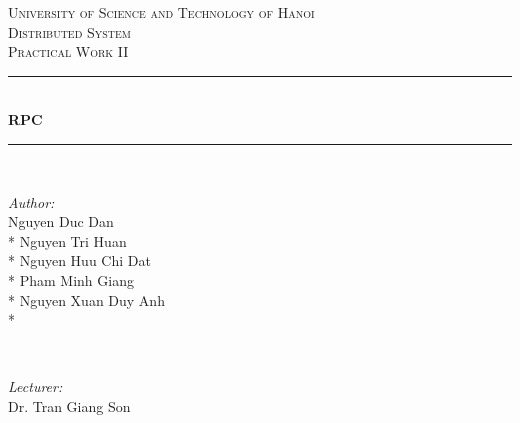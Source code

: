 \documentclass[12pt]{article}
\begin{document}
	
	\begin{titlepage}
		
		\newcommand{\HRule}{\rule{\linewidth}{0.1mm}} %
		
		\center %
		
		
		\textsc{\LARGE University of Science and
			\linebreak
			\linebreak
			Technology of Hanoi}\\[2cm] %
		\textsc{\Large Distributed System}\\[0.5cm] %
		\textsc{\large Practical Work II}\\[0.5cm] %
		
		
		\HRule \\[0.4cm]
		{ \huge \bfseries  RPC}\\[0.4cm] %
		\HRule \\[1.5cm]
		
		
		\begin{minipage}[t]{0.4\textwidth}
			\begin{flushleft} \large
				\emph{Author:}\\
				Nguyen Duc Dan \\*
				Nguyen Tri Huan	 \\*	
				Nguyen Huu Chi Dat \\* 
				Pham Minh Giang \\*
				Nguyen Xuan Duy Anh \\*
			\end{flushleft}
		\end{minipage}
		~
		\begin{minipage}[t]{0.4\textwidth}
			\begin{flushright} \large
				\emph{Lecturer:} \\
				Dr. Tran Giang Son %
			\end{flushright}
		\end{minipage}\\[2cm]
		

\end{titlepage}
\end{document}
